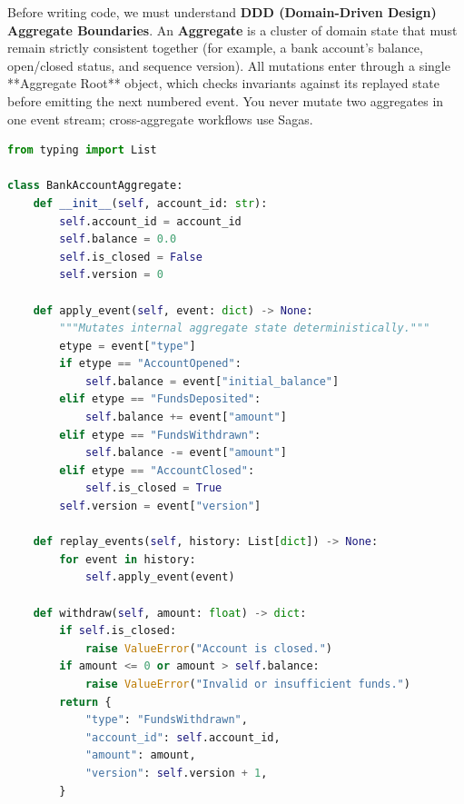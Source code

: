 Before writing code, we must understand \textbf{DDD (Domain-Driven Design) Aggregate Boundaries}. An \textbf{Aggregate} is a cluster of domain state that must remain strictly consistent together (for example, a bank account's balance, open/closed status, and sequence version). All mutations enter through a single **Aggregate Root** object, which checks invariants against its replayed state before emitting the next numbered event. You never mutate two aggregates in one event stream; cross-aggregate workflows use Sagas.

\begin{lstlisting}[language=Python, caption={Event-Sourced \texttt{BankAccountAggregate} in Python}]
from typing import List

class BankAccountAggregate:
    def __init__(self, account_id: str):
        self.account_id = account_id
        self.balance = 0.0
        self.is_closed = False
        self.version = 0

    def apply_event(self, event: dict) -> None:
        """Mutates internal aggregate state deterministically."""
        etype = event["type"]
        if etype == "AccountOpened":
            self.balance = event["initial_balance"]
        elif etype == "FundsDeposited":
            self.balance += event["amount"]
        elif etype == "FundsWithdrawn":
            self.balance -= event["amount"]
        elif etype == "AccountClosed":
            self.is_closed = True
        self.version = event["version"]

    def replay_events(self, history: List[dict]) -> None:
        for event in history:
            self.apply_event(event)

    def withdraw(self, amount: float) -> dict:
        if self.is_closed:
            raise ValueError("Account is closed.")
        if amount <= 0 or amount > self.balance:
            raise ValueError("Invalid or insufficient funds.")
        return {
            "type": "FundsWithdrawn",
            "account_id": self.account_id,
            "amount": amount,
            "version": self.version + 1,
        }
\end{lstlisting}

